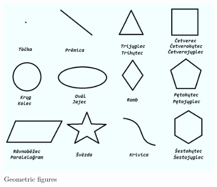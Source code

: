 \begin{figure}[!htb]
	\includegraphics[width=\linewidth]{./sources/figures.jpeg}
	\caption{Geometric figures}
	\label{fig:figures}
\end{figure}